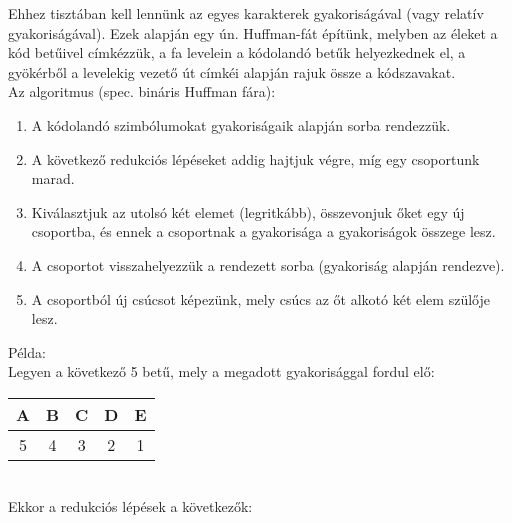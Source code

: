 \documentclass[margin=0px]{article}
\begin{document}
Ehhez tisztában kell lennünk az egyes karakterek gyakoriságával (vagy relatív gyakoriságával). Ezek alapján  egy ún. Huffman-fát építünk, melyben az éleket a kód betűivel címkézzük, a fa levelein a kódolandó betűk helyezkednek el, a gyökérből a levelekig vezető út címkéi alapján rajuk össze a kódszavakat.\\

\noindent
Az algoritmus (spec. bináris Huffman fára):
\begin{enumerate}
    \item A kódolandó szimbólumokat gyakoriságaik alapján sorba rendezzük.
    \item A következő redukciós lépéseket addig hajtjuk végre, míg egy csoportunk marad.
    \item Kiválasztjuk az utolsó két elemet (legritkább), összevonjuk őket egy új csoportba, és ennek a csoportnak a gyakorisága a gyakoriságok összege lesz.
    \item A csoportot visszahelyezzük a rendezett sorba (gyakoriság alapján rendezve).
    \item A csoportból új csúcsot képezünk, mely csúcs az őt alkotó két elem szülője lesz.
\end{enumerate}

\noindent
Példa:\\
Legyen a következő 5 betű, mely a megadott gyakorisággal fordul elő:\\

\begin{tabular}{|c|c|c|c|c|}
    \hline A & B & C & D & E \\
    \hline 5 & 4 & 3 & 2 & 1 \\
    \hline
\end{tabular}\\

Ekkor a redukciós lépések a következők:
\end{document}
